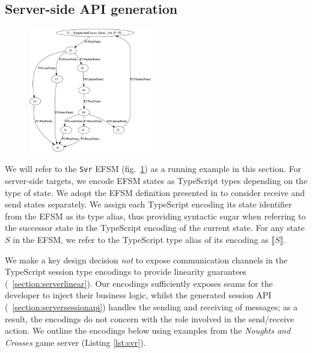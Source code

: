 \documentclass[submission,copyright,creativecommons]{eptcs}
\newcommand{\sectionref}[1]{\textsection~\ref{#1}}
\begin{document}
\subsection{Server-side API generation}
\label{section:server}

\begin{figure}
  \begin{center}
    \includegraphics[width=0.48\textwidth]{figures/efsm_svr.png}
  \end{center}

  \label{fig:efsmsvr}
\end{figure}


We will refer to the \texttt{Svr} EFSM (fig.~\ref{fig:efsmsvr}) as a running example in this section. For server-side targets, we encode EFSM states as TypeScript types depending on the type of state. We adopt the EFSM definition presented in \cite{Hybrid2016} to consider receive and send states separately. We assign each TypeScript encoding its state identifier from the EFSM as its type alias, thus providing syntactic sugar when referring to the successor state in the TypeScript encoding of the current state. For any state $S$ in the EFSM, we refer to the TypeScript type alias of its encoding as $\llbracket S \rrbracket$. 

We make a key design decision \textit{not} to expose communication channels in the TypeScript session type encodings to provide linearity guarantees (\sectionref{section:serverlinear}). Our encodings sufficiently exposes seams for the developer to inject their business logic, whilst the generated session API (\sectionref{section:serversessionapi}) handles the sending and receiving of messages; as a result, the encodings do not concern with the role involved in the send/receive action. We outline the encodings below using examples from the \textit{Noughts and Crosses} game server (Listing \ref{lst:svr}).
\end{document}
